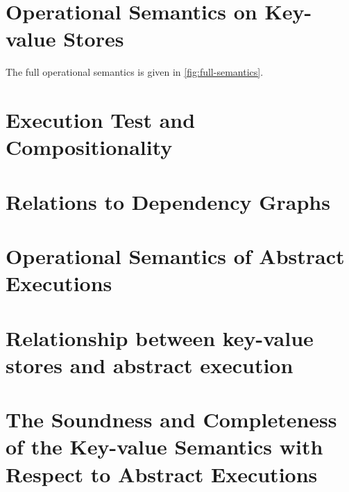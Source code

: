 \documentclass[conference,compsoc]{IEEEtran}
\newcommand{\RootPath}{.}
\begin{document}
  


\newpage
\onecolumn
\appendices
\section{Operational Semantics on Key-value Stores}
\label{sec:full-semantics}

The full operational semantics is given in \cref{fig:full-semantics}.

\section{Execution Test and Compositionality}
\label{app:compositionality}






\section{Relations to Dependency Graphs}
\label{app:depgraphs}
\label{sec:dependent-graph}

\section{Operational Semantics of Abstract Executions}


\section{Relationship between key-value stores and abstract execution}




\section{The Soundness and Completeness of the Key-value Semantics with Respect to Abstract Executions}
\label{sec:kv-sound-complete-proof}
\end{document}
